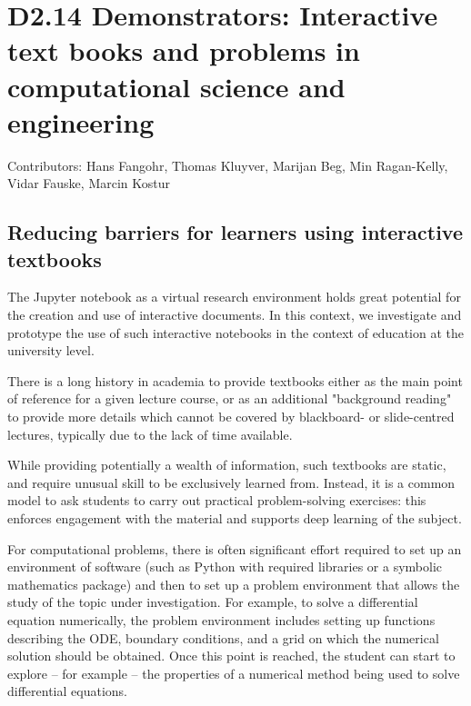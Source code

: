 \documentclass{deliverablereport}
\author{Marcin Kostur et al.}
\begin{document}
\maketitle
\githubissuedescription
\newpage
\tableofcontents
\newpage

\section{D2.14 Demonstrators: Interactive text books and problems in
  computational science and engineering}

Contributors: Hans Fangohr, Thomas Kluyver, Marijan Beg, Min
Ragan-Kelly, Vidar Fauske, Marcin Kostur

\subsection{Reducing barriers for learners using interactive textbooks}

The Jupyter notebook as a virtual research environment holds great
potential for the creation and use of interactive documents. In this
context, we investigate and prototype the use of such interactive
notebooks in the context of education at the university level.

There is a long history in academia to provide textbooks either as
the main point of reference for a given lecture course, or as an
additional "background reading" to provide more details which cannot
be covered by blackboard- or slide-centred lectures, typically due to
the lack of time available.

While providing potentially a wealth of information, such textbooks
are static, and require unusual skill to be exclusively learned
from. Instead, it is a common model to ask students to carry out
practical problem-solving exercises: this enforces engagement with the
material and supports deep learning of the subject.

For computational problems, there is often significant effort required
to set up an environment of software (such as Python with required
libraries or a symbolic mathematics package) and then to set up a
problem environment that allows the study of the topic under
investigation. For example, to solve a differential equation
numerically, the problem environment includes setting up functions
describing the ODE, boundary conditions, and a grid on which the
numerical solution should be obtained. Once this point is reached, the
student can start to explore -- for example -- the properties of a
numerical method being used to solve differential equations.
\end{document}
